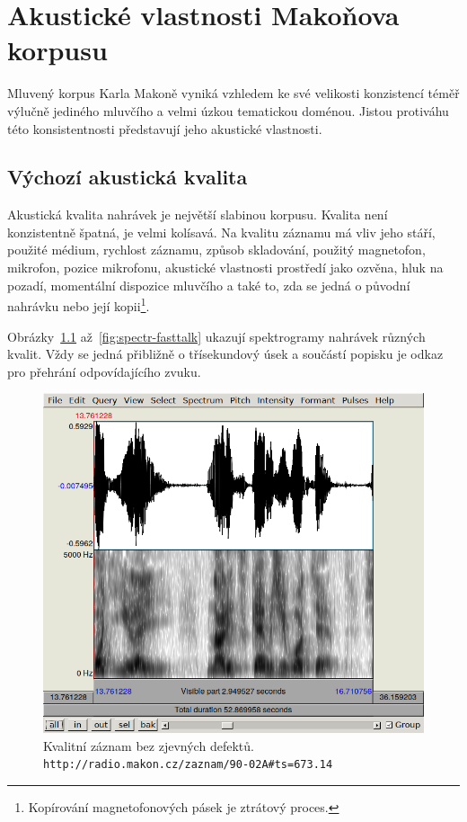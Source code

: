 \chapter{Akustické vlastnosti Makoňova korpusu}
\label{kap:akustika}

Mluvený korpus Karla Makoně vyniká vzhledem ke své velikosti konzistencí téměř
výlučně jediného mluvčího a velmi úzkou tematickou doménou. Jistou protiváhu
této konsistentnosti představují jeho akustické vlastnosti.

\section{Výchozí akustická kvalita}

Akustická kvalita nahrávek je největší slabinou korpusu. Kvalita není
konzistentně špatná, je velmi kolísavá. Na kvalitu záznamu má vliv jeho stáří,
použité médium, rychlost záznamu, způsob skladování, použitý
magnetofon, mikrofon, pozice mikrofonu, akustické vlastnosti prostředí jako
ozvěna, hluk na pozadí, momentální dispozice mluvčího a také to, zda se jedná o
původní nahrávku nebo její kopii\footnote{Kopírování magnetofonových pásek je ztrátový proces.}.

Obrázky~\ref{fig:spectr-ok} až~\ref{fig:spectr-fasttalk} ukazují spektrogramy
nahrávek různých kvalit. Vždy se jedná přibližně o třísekundový úsek a součástí
popisku je odkaz pro přehrání odpovídajícího zvuku.

\begin{figure}[htpb]
\includegraphics[scale=0.88]{rc/spectrum-dobry-90-02A.png}
\caption{
    Kvalitní záznam bez zjevných defektů.\\
    \texttt{http://radio.makon.cz/zaznam/90-02A\#ts=673.14}
}
\label{fig:spectr-ok}
\end{figure}

